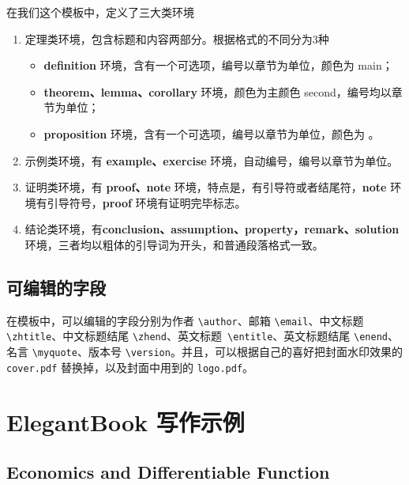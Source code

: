 \documentclass[titlestyle=hang,11pt]{elegantbook}
\begin{document}
在我们这个模板中，定义了三大类环境

\begin{enumerate}[noitemsep]
\item 定理类环境，包含标题和内容两部分。根据格式的不同分为3种
   \begin{itemize}[noitemsep]
      \item {\color{main}\bfseries definition} 环境，含有一个可选项，编号以章节为单位，颜色为 {\color{main}main}；
      \item {\color{second}\bfseries theorem、lemma、corollary} 环境，颜色为主颜色 {\color{second}second}，编号均以章节为单位；
      \item {\color{third}\bfseries proposition} 环境，含有一个可选项，编号以章节为单位，颜色为 {\color{third}{third}}。
   \end{itemize}
\item 示例类环境，有 \textbf{example、exercise} 环境，自动编号，编号以章节为单位。
\item 证明类环境，有 \textbf{proof、note} 环境，特点是，有引导符或者结尾符，\textbf{note} 环境有引导符号，\textbf{proof} 环境有证明完毕标志。
\item 结论类环境，有\textbf{conclusion、assumption、property，remark、solution} 环境，三者均以粗体的引导词为开头，和普通段落格式一致。
\end{enumerate}

\section{可编辑的字段}
在模板中，可以编辑的字段分别为作者 \verb|\author|、邮箱 \verb|\email|、中文标题 \verb|\zhtitle|、中文标题结尾 \verb|\zhend|、英文标题\verb| \entitle|、英文标题结尾 \verb|\enend|、名言 \verb|\myquote|、版本号 \verb|\version|。并且，可以根据自己的喜好把封面水印效果的 \verb|cover.pdf| 替换掉，以及封面中用到的 \verb|logo.pdf|。

\chapter{ElegantBook 写作示例}

\section{Economics and Differentiable Function}
\end{document}
